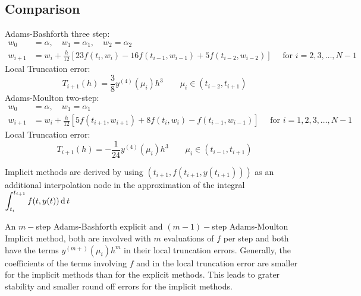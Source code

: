 \documentclass[../main-sheet.tex]{subfiles}
\begin{document}
\subsection{Comparison}
Adams-Bashforth three step:
\begin{align*}
    w_0&=\alpha, \quad w_1=\alpha_1,\quad w_2=\alpha_2\\
    w_{i+1}&=w_i+\frac{h}{12}\left[ 23f(t_i,w_i)-16f(t_{i-1},w_{i-1})+5f(t_{i-2},w_{i-2}) \right]\quad\text{ for } i=2,3,\dots, N-1
\end{align*}
Local Truncation error:
\[T_{i+1}(h)=\frac{3}{8}y^{(4)}(\mu_i)h^3\qquad \mu_i\in (t_{i-2},t_{i+1})\]
Adams-Moulton two-step:
\begin{align*}
    w_0&=\alpha, \quad w_1=\alpha_1\\
    w_{i+1}&=w_i+\frac{h}{12}\left[ 5f(t_{i+1},w_{i+1})+8f(t_{i},w_{i})-f(t_{i-1},w_{i-1}) \right]\quad\text{ for } i=1,2,3,\dots, N-1
\end{align*}
Local Truncation error:
\[T_{i+1}(h)=-\frac{1}{24}y^{(4)}(\mu_i)h^3\qquad \mu_i\in (t_{i-1},t_{i+1})\]
\begin{note}
    Implicit methods are derived by using \(\left( t_{i+1},f(t_{i+1},y(t_{i+1})) \right)\) as an additional interpolation node in the approximation of the integral \(\displaystyle \int_{t_i}^{t_{i+1}}f(t,y(t))\,\mathrm{d}\, t\)
\end{note}

An \(m-\)step Adams-Bashforth explicit and \((m-1)-\)step Adams-Moulton Implicit method, both are involved with \(m\) evaluations of \(f\) per step and both have the terms \(y^{(m+)}(\mu_i)h^m\) in their local truncation errors. Generally, the coefficients of the terms involving \(f\) and in the local truncation error are smaller for the implicit methods than for the explicit methods. This leads to grater stability and smaller round off errors for the implicit methods.
\end{document}
